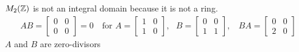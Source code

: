 \begin{example}
$M_2({\mathbb{Z}})$ is not an integral domain because it is not a  ring.
\begin{align}
    AB= \begin{bmatrix}
            0&0\\0&0
    \end{bmatrix} = 0 \ \ \ \text{ for } A= \begin{bmatrix}
            1&0\\1&0
    \end{bmatrix}, \ \ \ B= \begin{bmatrix}
            0&0\\1&1
    \end{bmatrix}, \ \ \ \ BA = \begin{bmatrix}
            0&0\\2&0
    \end{bmatrix} \nonumber
\end{align}
$A$ and $B$ are zero-divisors
\end{example}
\newpage

